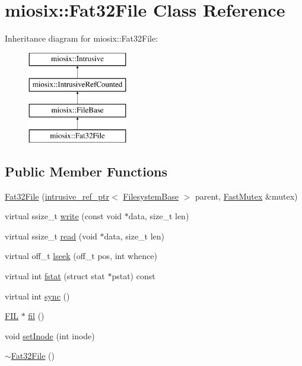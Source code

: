 \hypertarget{classmiosix_1_1_fat32_file}{\section{miosix\-:\-:Fat32\-File Class Reference}
\label{classmiosix_1_1_fat32_file}
}
Inheritance diagram for miosix\-:\-:Fat32\-File\-:\begin{figure}[H]
\begin{center}
\leavevmode
\includegraphics[height=4.000000cm]{classmiosix_1_1_fat32_file}
\end{center}
\end{figure}
\subsection*{Public Member Functions}
\begin{DoxyCompactItemize}
\item 
\hyperlink{classmiosix_1_1_fat32_file_a7b41ad7ab02324d30b029eccfbae5104}{Fat32\-File} (\hyperlink{classmiosix_1_1intrusive__ref__ptr}{intrusive\-\_\-ref\-\_\-ptr}$<$ \hyperlink{classmiosix_1_1_filesystem_base}{Filesystem\-Base} $>$ parent, \hyperlink{classmiosix_1_1_fast_mutex}{Fast\-Mutex} \&mutex)
\item 
virtual ssize\-\_\-t \hyperlink{classmiosix_1_1_fat32_file_a1e8f5d2c86cd5748f23e443f9cdd64e4}{write} (const void $\ast$data, size\-\_\-t len)
\item 
virtual ssize\-\_\-t \hyperlink{classmiosix_1_1_fat32_file_a2afbaf8a9e351720160d47bf3c452b85}{read} (void $\ast$data, size\-\_\-t len)
\item 
virtual off\-\_\-t \hyperlink{classmiosix_1_1_fat32_file_ac0a287c08341752b1b709a994d9c69ff}{lseek} (off\-\_\-t pos, int whence)
\item 
virtual int \hyperlink{classmiosix_1_1_fat32_file_a4f6440d2309c0e44ec723eb602238626}{fstat} (struct stat $\ast$pstat) const 
\item 
virtual int \hyperlink{classmiosix_1_1_fat32_file_a4d9a3a65b5893d9776ad4710ac2893f8}{sync} ()
\item 
\hyperlink{struct_f_i_l}{F\-I\-L} $\ast$ \hyperlink{classmiosix_1_1_fat32_file_a664a27cfa0eb301a30b2040411a66718}{fil} ()
\item 
void \hyperlink{classmiosix_1_1_fat32_file_adba8d693053b8f0b435c366284458c97}{set\-Inode} (int inode)
\item 
\hyperlink{classmiosix_1_1_fat32_file_a4e661b0b2d7874becbd339721e28b02b}{$\sim$\-Fat32\-File} ()
\end{DoxyCompactItemize}
